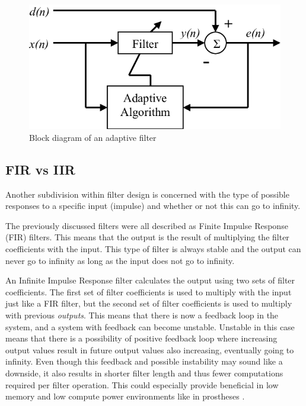 \begin{figure}[h!t]
	\begin{center}
		\includegraphics[width=0.7\columnwidth]{images/adaptive_filter_block_diagram.png}
	\end{center}
	\caption{Block diagram of an adaptive filter \cite{adaptive_filter_block_diagram}}
	\label{fig:adaptive_filter_diagram}
\end{figure}


\subsection{FIR vs IIR}
Another subdivision within filter design is concerned with the type of possible responses to a specific input (impulse) and whether or not this can go to infinity.

The previously discussed filters were all described as Finite Impulse Response (FIR) filters. This means that the output is the result of multiplying the filter coefficients with the input. This type of filter is always stable and the output can never go to infinity as long as the input does not go to infinity.

An Infinite Impulse Response filter calculates the output using two sets of filter coefficients. The first set of filter coefficients is used to multiply with the input just like a FIR filter, but the second set of filter coefficients is used to multiply with previous \textit{outputs}. This means that there is now a feedback loop in the system, and a system with feedback can become unstable. Unstable in this case means that there is a possibility of positive feedback loop where increasing output values result in future output values also increasing, eventually going to infinity. Even though this feedback and possible instability may sound like a downside, it also results in shorter filter length and thus fewer computations required per filter operation. This could especially provide beneficial in low memory and low compute power environments like in prostheses \cite{fir_vs_iir}.

